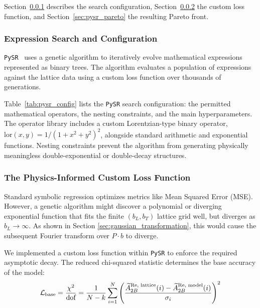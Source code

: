 Section~\ref{sec:pysr_config} describes the search configuration, Section~\ref{sec:pysr_loss} the custom loss function, and Section~\ref{sec:pysr_pareto} the resulting Pareto front.

\subsubsection{Expression Search and Configuration}
\label{sec:pysr_config}
\texttt{PySR}~\cite{Cranmer2023pysr, Koza1992GP, Schmidt2009Distilling} uses a genetic algorithm to iteratively evolve mathematical expressions represented as binary trees. The algorithm evaluates a population of expressions against the lattice data using a custom loss function over thousands of generations. 

Table~\ref{tab:pysr_config} lists the \texttt{PySR} search configuration: the permitted mathematical operators, the nesting constraints, and the main hyperparameters. The operator library includes a custom Lorentzian-type binary operator, $\text{lor}(x, y) = 1/(1 + x^2 + y^2)^2$, alongside standard arithmetic and exponential functions. Nesting constraints prevent the algorithm from generating physically meaningless double-exponential or double-decay structures.




\subsubsection{The Physics-Informed Custom Loss Function}
\label{sec:pysr_loss}

Standard symbolic regression optimizes metrics like Mean Squared Error (MSE). However, a genetic algorithm might discover a polynomial or diverging exponential function that fits the finite $(b_L, b_T)$ lattice grid well, but diverges as $b_L \to \infty$. As shown in Section \ref{sec:gaussian_transformation}, this would cause the subsequent Fourier transform over $P \cdot b$ to diverge.

We implemented a custom loss function within \texttt{PySR} to enforce the required asymptotic decay. The reduced chi-squared statistic determines the base accuracy of the model:
\begin{align}
    \mathcal{L}_{\text{base}} = \frac{\chi^2}{\text{dof}} = \frac{1}{N - k} \sum_{i=1}^{N} \left( \frac{\widetilde{A}_{2B}^{\text{Re, lattice}}(i) - \widetilde{A}_{2B}^{\text{Re, model}}(i)}{\sigma_i} \right)^2
\end{align}


